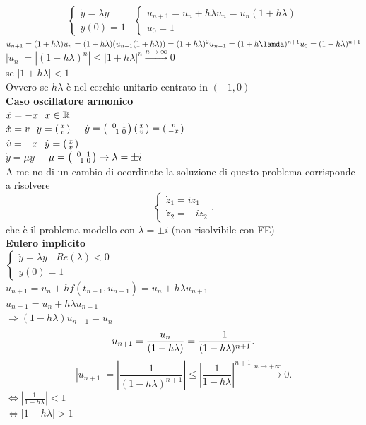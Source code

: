 \documentclass[12px]{article}
\begin{document}
 \[\begin{cases}
		\dot y = \lambda y\\
		y(0) = 1
	\end{cases}\ \ \begin{cases}
	u_{n+1} = u_n + h\lambda u_n = u_n ( 1 + h \lambda )\\
	u_0 = 1
	\end{cases}\] 
	$u_{n+1} = (1 + h\lambda) u_n = (1 + h\lambda)(u_{n-1}(1+h\lambda)) = (1 + h\lambda)^2u_{n-1} = (1+ h\lamda)^{n+1}u_0 = (1 + h\lambda)^{n+1}$\\
	$|u_n| = |(1+h\lambda)^n|\leq |1 + h\lambda|^n \xrightarrow{ n \rightarrow \infty} 0$\\
	se $|1 + h\lambda | < 1$ \\
	Ovvero se $h\lambda$ è nel cerchio unitario centrato in $(-1,0)$\\
	 \textbf{Caso oscillatore armonico}\\
	 $\ddot x = -x \ \ x\in \mathbb{R}$\\
	 $\dot x = v \ \ y = \left(\begin{smallmatrix}x\\v\end{smallmatrix}\right)$ \ \ $\dot y = \left(\begin{smallmatrix}0 & 1\\ -1 &0\end{smallmatrix}\right)\left(\begin{smallmatrix}x\\v\end{smallmatrix}\right) = \left(\begin{smallmatrix}v\\-x\end{smallmatrix}\right)$\\
	 $\dot v = -x \ \ \dot y = \left(\begin{smallmatrix}\dot x\\\dot v\end{smallmatrix}\right)$\\
	 $\dot y = \mu y$ \ \  $\mu = \left(\begin{smallmatrix}0 & 1\\-1 & 0\end{smallmatrix}\right) \rightarrow\lambda = \pm i$\\
	 A me no di un cambio di ocordinate la soluzione di questo problema corrisponde a risolvere
	 \[
	 \begin{cases}
	 	\dot z_1 = i z_1\\
		\dot z_2 = -i z_2
	 \end{cases}
	 .\] 
	 che è il problema modello con $\lambda = \pm i $ (non risolvibile con FE)\\
	  \textbf{Eulero implicito}\\
	  $
	  \begin{cases}
	  	\dot y = \lambda y\ \ \ \ Re(\lambda) < 0 \\ 
		y(0) = 1
	  \end{cases}
	  $\\
	  $u_{n+1} = u_n + hf(t_{n+1},u_{n+1}) = u_n + h\lambda u_{n+1}$\\
	  $u_{n=1} = u_n + h\lambda u_{n+1}$\\
	  $ \Rightarrow  (1-h\lambda)u_{n+1} = u_n$ \\
	  \[
		  u_{n+1} =\frac{ u_n}{(1-h\lambda)} = \frac{1}{(1-h\lambda)^{n+1}}\\
	  .\] 
	  \[
		  |u_{n+1}| = \left|\frac{1}{(1-h\lambda)^{n+1}}\right|\leq \left| \frac {1}{1-h\lambda}\right|^{n+1} \xrightarrow{n \rightarrow +\infty}0
	  .\] 
	  $ \Leftrightarrow \left| \frac 1{1-h\lambda} \right| <1$\\
	  $ \Leftrightarrow |1 - h\lambda| > 1$
\end{document}
